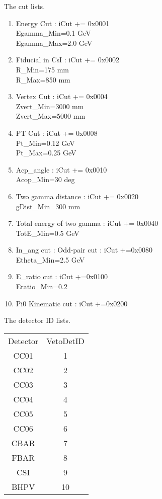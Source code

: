 \documentclass[a4paper,12pt]{article}
\begin{document}
  The cut lists.
  \begin{enumerate}
   \item Energy Cut : iCut += 0x0001\\
	 Egamma\_Min=0.1 GeV\\
	 Egamma\_Max=2.0 GeV
   \item Fiducial in CsI : iCut += 0x0002\\
	 R\_Min=175 mm\\
	 R\_Max=850 mm
   \item Vertex Cut : iCut += 0x0004\\
	 Zvert\_Min=3000 mm\\
	 Zvert\_Max=5000 mm
   \item PT Cut : iCut += 0x0008\\
	 Pt\_Min=0.12 GeV\\
	 Pt\_Max=0.25 GeV
   \item Acp\_angle  : iCut += 0x0010\\
	 Acop\_Min=30 deg
   \item Two gamma distance : iCut += 0x0020\\
	 gDist\_Min=300 mm
   \item Total energy of two gamma : iCut += 0x0040\\
	 TotE\_Min=0.5 GeV
   \item In\_ang cut : Odd-pair cut : iCut +=0x0080\\
	 Etheta\_Min=2.5 GeV
   \item E\_ratio cut  : iCut +=0x0100\\
	 Eratio\_Min=0.2
   \item Pi0 Kinematic cut : iCut +=0x0200\\
  \end{enumerate}

  The detector ID lists.
  \begin{table}[h]
   \begin{tabular}{c|c}
    Detector&VetoDetID \\
    CC01&1 \\
    CC02&2 \\
    CC03&3 \\
    CC04&4 \\
    CC05&5 \\
    CC06&6 \\
    CBAR&7 \\
    FBAR&8 \\
    CSI&9 \\
    BHPV&10 
   \end{tabular}
  \end{table}
\end{document}
